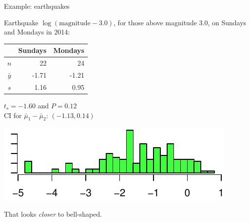 %
\begin{frame}{Example: earthquakes}

%   

Earthquake \alert{$\log(\text{magnitude}-3.0)$}, for those above magnitude 3.0, on Sundays and Mondays in 2014:
  \begin{center}
    \begin{tabular}{crr}
       & Sundays & Mondays \\
       \hline
       $n$ & 22 & 24 \\
       $\bar y$ & -1.71 & -1.21 \\
       $s$ & 1.16 & 0.95
     \end{tabular}

   \vspace{2em}

   {$t_s=-1.60$ and $P=0.12$}\\
   CI for $\bar \mu_1 - \bar \mu_2$: $(-1.13,0.14)$
   \end{center}

   \pause 
   \begin{center}
     \includegraphics{quakes-log-mag-hist}
   \end{center}

   That looks \emph{closer} to bell-shaped.

\end{frame}


